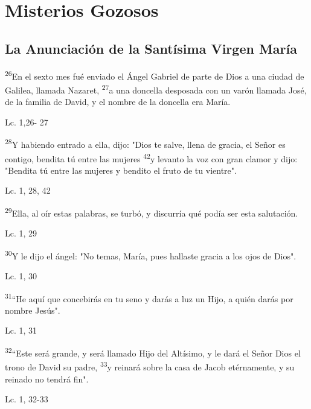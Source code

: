 \documentclass[a4paper,11pt]{article}
\begin{document}
  \section*{\hfil Misterios Gozosos \hfil}
    \subsection*{\hfil La Anunciación de la Santísima Virgen María \hfil}

      \textsuperscript{26}En el sexto mes fué enviado el Ángel Gabriel de parte de Dios a una ciudad de Galilea, llamada Nazaret, \textsuperscript{27}a una 
      doncella desposada con un varón llamada José, de la familia de David, y el nombre de la doncella era María.
      \begin{flushright}
        Lc. 1,26- 27
      \end{flushright}
      \medskip

      \textsuperscript{28}Y habiendo entrado a ella, dijo: "Dios te salve, llena de gracia, el Señor es contigo, bendita tú entre las mujeres 
      \textsuperscript{42}y levanto la voz con gran clamor y dijo: "Bendita tú entre las mujeres y bendito el fruto de tu vientre".
      \begin{flushright}
        Lc. 1, 28, 42
      \end{flushright}
      \medskip

      \textsuperscript{29}Ella, al oír estas palabras, se turbó, y discurría qué podía ser esta salutación.
      \begin{flushright}
        Lc. 1, 29
      \end{flushright}
      \medskip

      \textsuperscript{30}Y le dijo el ángel: "No temas, María, pues hallaste gracia a los ojos de Dios".
      \begin{flushright}
        Lc. 1, 30
      \end{flushright}
      \medskip

      \textsuperscript{31}``He aquí que concebirás en tu seno y darás a luz un Hijo, a quién darás por nombre Jesús".
      \begin{flushright}
        Lc. 1, 31
      \end{flushright}
      \medskip

      \textsuperscript{32}``Este será grande, y será llamado Hijo del Altísimo, y le dará el Señor Dios el trono de David su padre, \textsuperscript{33}y reinará
      sobre la casa de Jacob etérnamente, y su reinado no tendrá fin".
      \begin{flushright}
        Lc. 1, 32-33
      \end{flushright}
      \medskip
\end{document}
